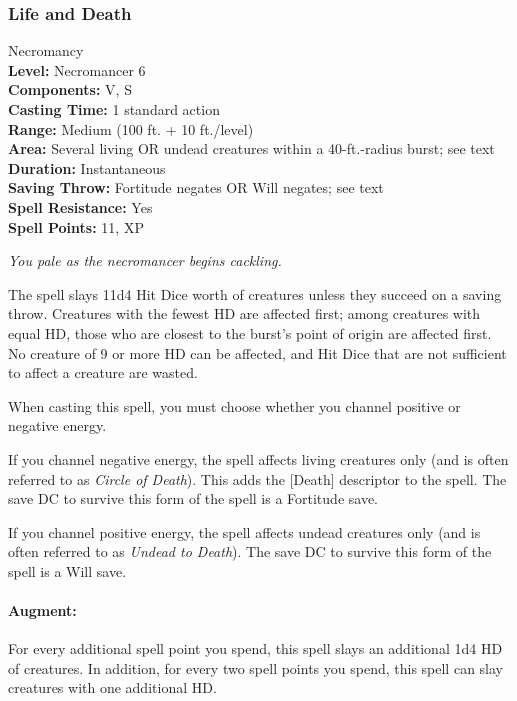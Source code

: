 \subsubsection{Life and Death}
\label{Spell:LifeAndDeath}
Necromancy
\\ \textbf{Level:} Necromancer 6
\\ \textbf{Components:} V, S
\\ \textbf{Casting Time:} 1 standard action
\\ \textbf{Range:} Medium (100 ft. + 10 ft./level)
\\ \textbf{Area:} Several living OR undead creatures within a 40-ft.-radius burst; see text
\\ \textbf{Duration:} Instantaneous
\\ \textbf{Saving Throw:} Fortitude negates OR Will negates; see text
\\ \textbf{Spell Resistance:} Yes
\\ \textbf{Spell Points:} 11, XP

\emph{You pale as the necromancer begins cackling.}

The spell slays 11d4 Hit Dice worth of creatures unless they succeed on a saving throw. 
Creatures with the fewest HD are affected first; 
among creatures with equal HD, those who are closest to the burst's point of origin are affected first. 
No creature of 9 or more HD can be affected, and Hit Dice that are not sufficient to affect a creature are wasted.

When casting this spell, you must choose whether you channel positive or negative energy. 
\begin{list}{}{\leftmargin=1em}
 \item If you channel negative energy, the spell affects living creatures only (and is often referred to as \emph{Circle of Death}). 
 This adds the [Death] descriptor to the spell.
 The save DC to survive this form of the spell is a Fortitude save.
 \item If you channel positive energy, the spell affects undead creatures only (and is often referred to as \emph{Undead to Death}). 
 The save DC to survive this form of the spell is a Will save.
\end{list}

\paragraph{Augment:} For every additional spell point you spend, this spell slays an additional 1d4 HD of creatures.
In addition, for every two spell points you spend, this spell can slay creatures with one additional HD.


